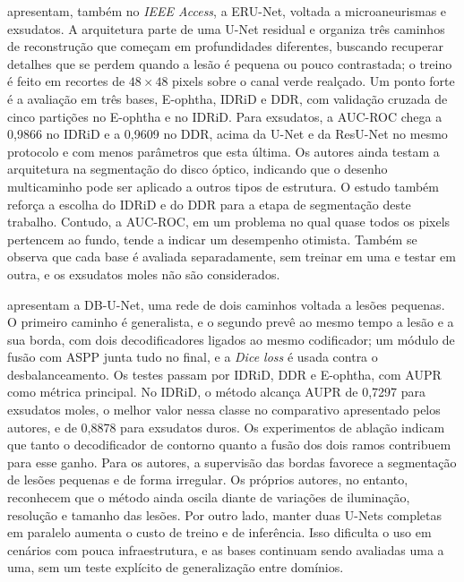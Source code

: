  apresentam, também no \textit{IEEE Access}, a ERU-Net, voltada a microaneurismas e exsudatos. A arquitetura parte de uma U-Net residual e organiza três caminhos de reconstrução que começam em profundidades diferentes, buscando recuperar detalhes que se perdem quando a lesão é pequena ou pouco contrastada; o treino é feito em recortes de $48 \times 48$ pixels sobre o canal verde realçado. Um ponto forte é a avaliação em três bases, E-ophtha, IDRiD e DDR, com validação cruzada de cinco partições no E-ophtha e no IDRiD. Para exsudatos, a AUC-ROC chega a 0,9866 no IDRiD e a 0,9609 no DDR, acima da U-Net e da ResU-Net no mesmo protocolo e com menos parâmetros que esta última. Os autores ainda testam a arquitetura na segmentação do disco óptico, indicando que o desenho multicaminho pode ser aplicado a outros tipos de estrutura. O estudo também reforça a escolha do IDRiD e do DDR para a etapa de segmentação deste trabalho. Contudo, a AUC-ROC, em um problema no qual quase todos os pixels pertencem ao fundo, tende a indicar um desempenho otimista. Também se observa que cada base é avaliada separadamente, sem treinar em uma e testar em outra, e os exsudatos moles não são considerados.

 apresentam a DB-U-Net, uma rede de dois caminhos voltada a lesões pequenas. O primeiro caminho é generalista, e o segundo prevê ao mesmo tempo a lesão e a sua borda, com dois decodificadores ligados ao mesmo codificador; um módulo de fusão com ASPP junta tudo no final, e a \textit{Dice loss} é usada contra o desbalanceamento. Os testes passam por IDRiD, DDR e E-ophtha, com AUPR como métrica principal. No IDRiD, o método alcança AUPR de 0,7297 para exsudatos moles, o melhor valor nessa classe no comparativo apresentado pelos autores, e de 0,8878 para exsudatos duros. Os experimentos de ablação indicam que tanto o decodificador de contorno quanto a fusão dos dois ramos contribuem para esse ganho. Para os autores, a supervisão das bordas favorece a segmentação de lesões pequenas e de forma irregular. Os próprios autores, no entanto, reconhecem que o método ainda oscila diante de variações de iluminação, resolução e tamanho das lesões. Por outro lado, manter duas U-Nets completas em paralelo aumenta o custo de treino e de inferência. Isso dificulta o uso em cenários com pouca infraestrutura, e as bases continuam sendo avaliadas uma a uma, sem um teste explícito de generalização entre domínios.

